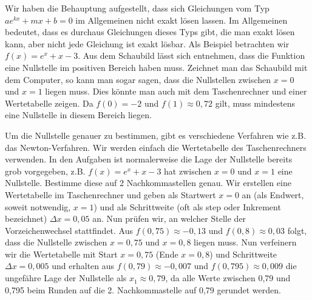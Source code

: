 Wir haben die Behauptung aufgestellt, dass sich Gleichungen vom Typ \(ae^{kx}+mx+b=0\) im Allgemeinen nicht exakt lösen lassen. Im Allgemeinen bedeutet, dass es durchaus Gleichungen dieses Typs gibt, die man exakt lösen kann, aber nicht jede Gleichung ist exakt lösbar. Als Beispiel betrachten wir \(f(x)=e^x+x-3\). Aus dem Schaubild lässt sich entnehmen, dass die Funktion eine Nullstelle im positiven Bereich haben muss. Zeichnet man das Schaubild mit dem Computer, so kann man sogar sagen, dass die Nullstellen zwischen \(x=0\) und \(x=1\) liegen muss. Dies könnte man auch mit dem Taschenrechner und einer Wertetabelle zeigen. Da \(f(0)=-2\) und \(f(1)\approx 0,72\) gilt, muss mindestens eine Nullstelle in diesem Bereich liegen.

\medskip

\begin{minipage}{\textwidth}
\end{minipage}

\medskip

Um die Nullstelle genauer zu bestimmen, gibt es verschiedene Verfahren wie z.B. das Newton-Verfahren. Wir werden einfach die Wertetabelle des Taschenrechners verwenden. In den Aufgaben ist normalerweise die Lage der Nullstelle bereits grob vorgegeben, z.B. \(f(x)=e^x+x-3\) hat zwischen \(x=0\) und \(x=1\) eine Nullstelle. Bestimme diese auf 2 Nachkommastellen genau. Wir erstellen eine Wertetabelle im Taschenrechner und geben als Startwert \(x=0\) an (als Endwert, soweit notwendig, \(x=1\)) und als Schrittweite (oft als step oder Inkrement bezeichnet) \(\Delta x=0,05\) an. Nun prüfen wir, an welcher Stelle der Vorzeichenwechsel stattfindet. Aus \(f(0,75)\approx -0,13\) und \(f(0,8)\approx 0,03\) folgt, dass die Nullstelle zwischen \(x=0,75\) und \(x=0,8\) liegen muss. Nun verfeinern wir die Wertetabelle mit Start \(x=0,75\) (Ende \(x=0,8\)) und Schrittweite \(\Delta x=0,005\) und erhalten aus \(f(0,79)\approx -0,007\) und \(f(0,795)\approx 0,009\) die ungefähre Lage der Nullstelle als \(x_1\approx 0,79\), da alle Werte zwischen 0,79 und 0,795 beim Runden auf die 2. Nachkommastelle auf 0,79 gerundet werden.

